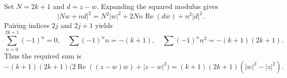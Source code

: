 Set $N=2k+1$ and $d=z-w$. Expanding the squared modulus gives
\[
|Nw+nd|^2=N^2|w|^2+2Nn\operatorname{Re}(d\overline w)+n^2|d|^2.
\]
Pairing indices $2j$ and $2j+1$ yields
\[
\sum_{n=0}^{2k+1}(-1)^n=0,\quad
\sum(-1)^nn=-(k+1),\quad
\sum(-1)^nn^2=-(k+1)(2k+1).
\]
Thus the required sum is
\[
-(k+1)(2k+1)\bigl(2\operatorname{Re}((z-w)\overline w)+|z-w|^2\bigr)
=\boxed{(k+1)(2k+1)(|w|^2-|z|^2)}.
\]
